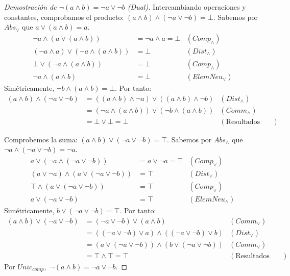 {\begin{proof}[Demostración de $\neg (a \wedge b) = \neg a \vee \neg b$ (Dual)]
Intercambiando operaciones y constantes, comprobamos el producto: $(a \wedge b) \wedge (\neg a \vee \neg b) = \bot.$
Sabemos por $Abs_\vee$ que $a \vee (a \wedge b) = a.$
\begin{align*}
    \neg a \wedge (a \vee (a \wedge b)) &= \neg a \wedge a = \bot & (Comp_\wedge) \\
    (\neg a \wedge a) \vee (\neg a \wedge (a \wedge b)) &= \bot & (Dist_\wedge) \\
    \bot \vee (\neg a \wedge (a \wedge b)) &= \bot & (Comp_\wedge) \\
    \neg a \wedge (a \wedge b) &= \bot & (ElemNeu_\vee)
\end{align*}
Simétricamente, $\neg b \wedge (a \wedge b) = \bot.$
Por tanto:
\begin{align*}
    (a \wedge b) \wedge (\neg a \vee \neg b) &= ((a \wedge b) \wedge \neg a) \vee ((a \wedge b) \wedge \neg b) & (Dist_\wedge) \\
    &= (\neg a \wedge (a \wedge b)) \vee (\neg b \wedge (a \wedge b)) & (Comm_\wedge) \\
    &= \bot \vee \bot = \bot & (\text{Resultados anteriores})
\end{align*}

Comprobemos la suma: $(a \wedge b) \vee (\neg a \vee \neg b) = \top.$
Sabemos por $Abs_\wedge$ que $\neg a \wedge (\neg a \vee \neg b) = \neg a.$
\begin{align*}
    a \vee (\neg a \wedge (\neg a \vee \neg b)) &= a \vee \neg a = \top & (Comp_\vee) \\
    (a \vee \neg a) \wedge (a \vee (\neg a \vee \neg b)) &= \top & (Dist_\vee) \\
    \top \wedge (a \vee (\neg a \vee \neg b)) &= \top & (Comp_\vee) \\
    a \vee (\neg a \vee \neg b) &= \top & (ElemNeu_\wedge)
\end{align*}
Simétricamente, $b \vee (\neg a \vee \neg b) = \top.$
Por tanto:
\begin{align*}
    (a \wedge b) \vee (\neg a \vee \neg b) &= (\neg a \vee \neg b) \vee (a \wedge b) & (Comm_\vee) \\
    &= ((\neg a \vee \neg b) \vee a) \wedge ((\neg a \vee \neg b) \vee b) & (Dist_\vee) \\
    &= (a \vee (\neg a \vee \neg b)) \wedge (b \vee (\neg a \vee \neg b)) & (Comm_\vee) \\
    &= \top \wedge \top = \top & (\text{Resultados anteriores})
\end{align*}
Por $Unic_{comp},$ $\neg (a \wedge b) = \neg a \vee \neg b.$
\end{proof}

}
